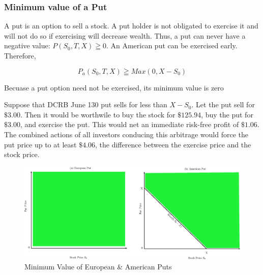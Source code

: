 \documentclass{book}
\theoremstyle{definition}
\theoremstyle{remark}
\begin{document}
        \subsubsection{Minimum value of a Put}
    
            A put is an option to sell a stock. A put holder is not obligated to exercise it and will not do so if exercising will decrease wealth. Thus, a put can never have a negative value: $P(S_0, T, X) \geqq 0$. An American put can be exercised early. Therefore, 
            
                \begin{equation}
                    P_a(S_0,T,X) \geqq Max(0, X - S_0)
                \end{equation}
            
        \begin{tcolorbox}[colback=blue!5!white,colframe=blue!75!black, title=Sticky Note]
            Becuase a put option need not be exercised, its minimum value is zero
        \end{tcolorbox}             
            
            Suppose that DCRB June 130 put sells for less than $X - S_0$. Let the put sell for $\$3.00$. Then it would be worthwile to buy the stock for $\$125.94$, buy the put for $\$3.00$, and exercise the put. This would net an immediate risk-free profit of $\$1.06$. The combined actions of all investors conducing this arbitrage would force the put price up to at least $\$4.06$, the difference between the exercise price and the stock price.
            
                \begin{figure}[h]
                    \centering
                        \includegraphics[scale=0.45]{images/fig:PutMin.eps}
                    \caption{Minimum Value of European \& American Puts}
                    \label{fig:PutMin}                
                \end{figure}
                
\end{document}
